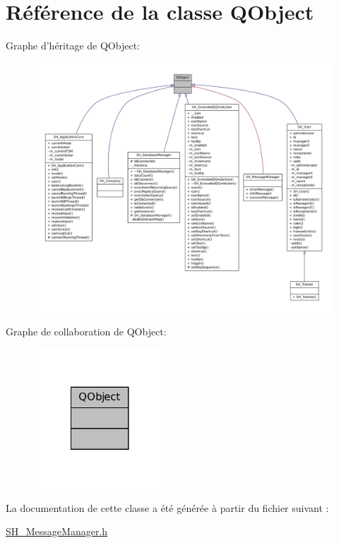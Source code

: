 \hypertarget{classQObject}{\section{Référence de la classe Q\-Object}
\label{classQObject}
}


Graphe d'héritage de Q\-Object\-:
\nopagebreak
\begin{figure}[H]
\begin{center}
\leavevmode
\includegraphics[width=350pt]{classQObject__inherit__graph}
\end{center}
\end{figure}


Graphe de collaboration de Q\-Object\-:
\nopagebreak
\begin{figure}[H]
\begin{center}
\leavevmode
\includegraphics[width=140pt]{classQObject__coll__graph}
\end{center}
\end{figure}


La documentation de cette classe a été générée à partir du fichier suivant \-:\begin{DoxyCompactItemize}
\item 
\hyperlink{SH__MessageManager_8h}{S\-H\-\_\-\-Message\-Manager.\-h}\end{DoxyCompactItemize}
